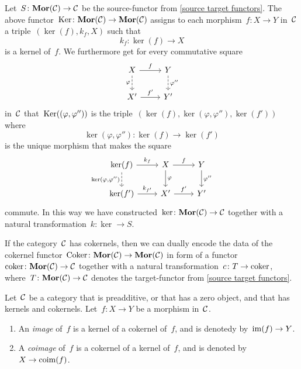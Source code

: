 \begin{remark*}
\begin{enumerate}
      Let~$S \colon \mathbf{Mor}(\mathcal{C}) \to \mathcal{C}$ be the source-functor from \cref{source target functors}.
      The above functor~$\operatorname{Ker} \colon \mathbf{Mor}(\mathcal{C}) \to \mathbf{Mor}(\mathcal{C})$ assigns to each morphism~$f \colon X \to Y$ in~$\mathcal{C}$ a triple~$(\ker(f), k_f, X)$ such that
      \[
                k_f
        \colon  \ker(f)
        \to     X
      \]
      is a kernel of~$f$.
      We furthermore get for every commutative square
      \[
        \begin{tikzcd}
            X
            \arrow{r}[above]{f}
            \arrow[dashed]{d}[left]{\varphi}
          & Y
            \arrow[dashed]{d}[right]{\varphi''}
          \\
            X'
            \arrow{r}[above]{f'}
          & Y'
        \end{tikzcd}
      \]
      in~$\mathcal{C}$ that~$\operatorname{Ker}((\varphi,\varphi''))$ is the triple~$(\ker(f), \ker(\varphi,\varphi''), \ker(f'))$ where
      \[
                \ker(\varphi, \varphi'')
        \colon  \ker(f)
        \to     \ker(f')
      \]
      is the unique morphism that makes the square
      \[
        \begin{tikzcd}
            \ker(f)
            \arrow{r}[above]{k_f}
            \arrow[dashed]{d}[left]{\ker(\varphi, \varphi'')}
          & X
            \arrow{r}[above]{f}
            \arrow{d}[right]{\varphi}
          & Y
            \arrow{d}[right]{\varphi''}
          \\
            \ker(f')
            \arrow{r}[above]{k_{f'}}
          & X'
            \arrow{r}[above]{f'}
          & Y'
        \end{tikzcd}
      \]
      commute.
      In this way we have constructed~$\ker \colon \mathbf{Mor}(\mathcal{C}) \to \mathcal{C}$ together with a natural transformation~$k \colon \ker \to S$.
      
      If the category~$\mathcal{C}$ has cokernels, then we can dually encode the data of the cokernel functor~$\operatorname{Coker} \colon \mathbf{Mor}(\mathcal{C}) \to \mathbf{Mor}(\mathcal{C})$ in form of a functor~$\operatorname{coker} \colon \mathbf{Mor}(\mathcal{C}) \to \mathcal{C}$ together with a natural transformation~$c \colon T \to \operatorname{coker}$, where~$T \colon \mathbf{Mor}(\mathcal{C}) \to \mathcal{C}$ denotes the target-functor from \cref{source target functors}.
  \end{enumerate}
\end{remark*}


\begin{definition}
  Let~$\mathcal{C}$ be a category that is preadditive, or that has a zero object, and that has kernels and cokernels.
  Let~$f \colon X \to Y$ be a morphism in~$\mathcal{C}$.
  \begin{enumerate}
    \item
      An \emph{image} of~$f$ is a kernel of a cokernel of~$f$, and is denotedy by~$\operatorname{im}(f) \to Y$.
    \item
      A \emph{coimage} of~$f$ is a cokernel of a kernel of~$f$, and is denoted by~$X \to \operatorname{coim}(f)$.
  \end{enumerate}
\end{definition}


